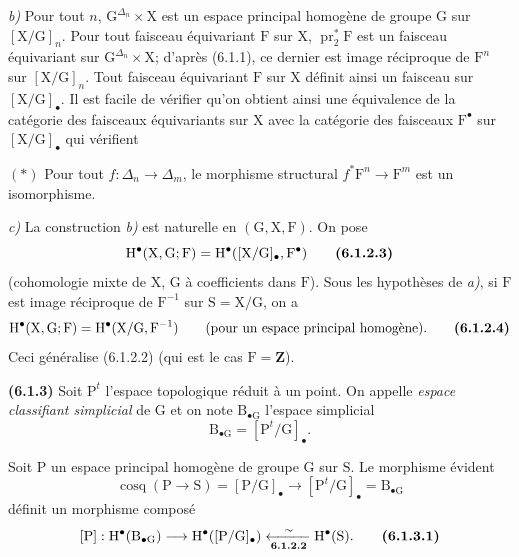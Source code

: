\documentclass[11pt,leqno]{article}
\begin{document}
\textit{b)} Pour tout \(n\), \(\mathrm{G}^{\Delta_n}\times\mathrm{X}\) est un espace principal homogène de groupe \(\mathrm{G}\) sur \([\mathrm{X}/\mathrm{G}]_n\). Pour tout faisceau équivariant \(\mathrm{F}\) sur \(\mathrm{X}\), \(\operatorname{pr}_2^*\mathrm{F}\) est un faisceau équivariant sur \(\mathrm{G}^{\Delta_n}\times\mathrm{X}\); d’après (6.1.1), ce dernier est image réciproque de \(\mathrm{F}^n\) sur \([\mathrm{X}/\mathrm{G}]_n\). Tout faisceau équivariant \(\mathrm{F}\) sur \(\mathrm{X}\) définit ainsi un faisceau sur \([\mathrm{X}/\mathrm{G}]_{\bullet}\). Il est facile de vérifier qu’on obtient ainsi une équivalence de la catégorie des faisceaux équivariants sur \(\mathrm{X}\) avec la catégorie des faisceaux \(\mathrm{F}^{\bullet}\) sur \([\mathrm{X}/\mathrm{G}]_{\bullet}\) qui vérifient

\((\ast)\) Pour tout \(f:\Delta_n\to\Delta_m\), le morphisme structural \(f^*\mathrm{F}^n\to\mathrm{F}^m\) est un isomorphisme.

\textit{c)} La construction \textit{b)} est naturelle en \((\mathrm{G},\mathrm{X},\mathrm{F})\). On pose
\[
\mathrm{H}^{\bullet}(\mathrm{X},\mathrm{G};\mathrm{F})
=\mathrm{H}^{\bullet}([\mathrm{X}/\mathrm{G}]_{\bullet},\mathrm{F}^{\bullet})
\tag*{\textbf{(6.1.2.3)}}
\]
(cohomologie mixte de \(\mathrm{X}\), \(\mathrm{G}\) à coefficients dans \(\mathrm{F}\)). Sous les hypothèses de \textit{a)}, si \(\mathrm{F}\) est image réciproque de \(\mathrm{F}^{-1}\) sur \(\mathrm{S}=\mathrm{X}/\mathrm{G}\), on a
\[
\mathrm{H}^{\bullet}(\mathrm{X},\mathrm{G};\mathrm{F})
=\mathrm{H}^{\bullet}(\mathrm{X}/\mathrm{G},\mathrm{F}^{-1})
\qquad\text{(pour un espace principal homogène).}
\tag*{\textbf{(6.1.2.4)}}
\]
Ceci généralise (6.1.2.2) (qui est le cas \(\mathrm{F}=\mathbf{Z}\)).

\textbf{(6.1.3)} Soit \(\mathrm{P}^{t}\) l’espace topologique réduit à un point. On appelle \textit{espace classifiant simplicial} de \(\mathrm{G}\) et on note \(\mathrm{B}_{\bullet\mathrm{G}}\) l’espace simplicial
\[
\mathrm{B}_{\bullet\mathrm{G}}=[\mathrm{P}^{t}/\mathrm{G}]_{\bullet}.
\]

Soit \(\mathrm{P}\) un espace principal homogène de groupe \(\mathrm{G}\) sur \(\mathrm{S}\). Le morphisme évident
\[
\operatorname{cosq}(\mathrm{P}\to\mathrm{S})
=[\mathrm{P}/\mathrm{G}]_{\bullet}
\to[\mathrm{P}^{t}/\mathrm{G}]_{\bullet}
=\mathrm{B}_{\bullet\mathrm{G}}
\]
définit un morphisme composé
\[
[\mathrm{P}]:
\mathrm{H}^{\bullet}(\mathrm{B}_{\bullet\mathrm{G}})
\longrightarrow
\mathrm{H}^{\bullet}([\mathrm{P}/\mathrm{G}]_{\bullet})
\xleftarrow[\text{\textbf{6.1.2.2}}]{\sim}
\mathrm{H}^{\bullet}(\mathrm{S}).
\tag*{\textbf{(6.1.3.1)}}
\]
\end{document}
